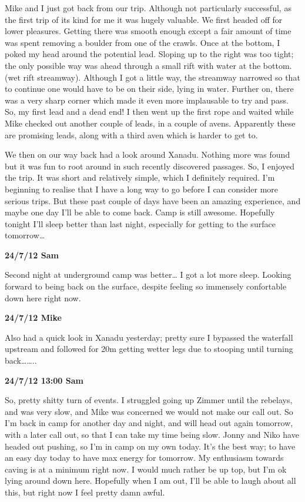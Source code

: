Mike and I just got back from our trip. Although not particularly
successful, as the first trip of its kind for me it was hugely valuable.
We first headed off for lower pleasures. Getting there was smooth enough
except a fair amount of time was spent removing a boulder from one of
the crawls. Once at the bottom, I poked my head around the potential
lead. Sloping up to the right was too tight; the only possible way was
ahead through a small rift with water at the bottom. (wet rift
streamway). Although I got a little way, the streamway narrowed so that
to continue one would have to be on their side, lying in water. Further
on, there was a very sharp corner which made it even more implausable to
try and pass. So, my first lead and a dead end! I then went up the first
rope and waited while Mike checked out another couple of leads, in a
couple of avens. Apparently these are promising leads, along with a
third aven which is harder to get to.

We then on our way back had a look around Xanadu. Nothing more was found
but it was fun to root around in such recently discovered passages. So,
I enjoyed the trip. It was short and relatively simple, which I
definitely required. I'm beginning to realise that I have a long way to
go before I can consider more serious trips. But these past couple of
days have been an amazing experience, and maybe one day I'll be able to
come back. Camp is still awesome. Hopefully tonight I'll sleep better
than last night, especially for getting to the surface tomorrow\ldots{}

\textbf{24/7/12 Sam}

Second night at underground camp was better\ldots{} I got a lot more
sleep. Looking forward to being back on the surface, despite feeling so
immensely confortable down here right now.

\textbf{24/7/12 Mike}

Also had a quick look in Xanadu yesterday; pretty sure I bypassed the
waterfall upstream and followed for 20m getting wetter legs due to
stooping until turning back\ldots{}\ldots{}..

\textbf{24/7/12 13:00 Sam}

So, pretty shitty turn of events. I struggled going up Zimmer until the
rebelays, and was very slow, and Mike was concerned we would not make
our call out. So I'm back in camp for another day and night, and will
head out again tomorrow, with a later call out, so that I can take my
time being slow. Jonny and Niko have headed out pushing, so I'm in camp
on my own today. It's the best way; to have an easy day today to have
max energy for tomorrow. My enthusiasm towards caving is at a minimum
right now. I would much rather be up top, but I'm ok lying around down
here. Hopefully when I am out, I'll be able to laugh about all this, but
right now I feel pretty damn awful.

